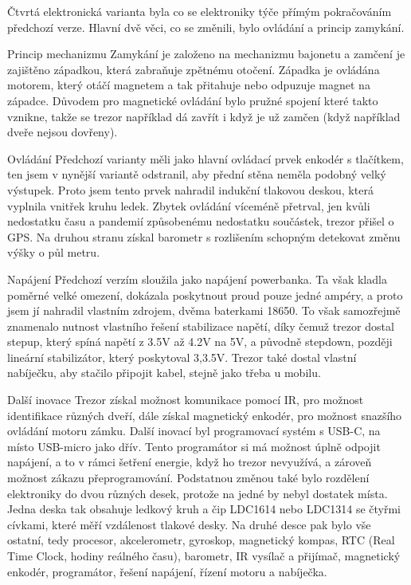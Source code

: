 Čtvrtá elektronická varianta byla co se elektroniky týče přímým pokračováním předchozí verze. Hlavní dvě věci, co se změnili, bylo ovládání 
a princip zamykání. 

Princip mechanizmu
Zamykání je založeno na mechanizmu bajonetu a zamčení je zajištěno západkou, která zabraňuje zpětnému otočení.
Západka je ovládána motorem, který otáčí magnetem a tak přitahuje nebo odpuzuje magnet na západce. Důvodem pro magnetické ovládání
bylo pružné spojení které takto vznikne, takže se trezor například dá zavřít i když je už zamčen (když například dveře nejsou dovřeny).

Ovládání
Předchozí varianty měli jako hlavní ovládací prvek enkodér s tlačítkem, ten jsem v nynější variantě odstranil, aby přední stěna neměla podobný velký 
výstupek. Proto jsem tento prvek nahradil indukční tlakovou deskou, která vyplnila vnitřek kruhu ledek. 
Zbytek ovládání víceméně přetrval, jen kvůli nedostatku času a pandemií způsobenému nedostatku součástek, trezor přišel o GPS. Na druhou stranu 
získal barometr s rozlišením schopným detekovat změnu výšky o půl metru.

Napájení
Předchozí verzím sloužila jako napájení powerbanka. Ta však kladla poměrné velké omezení, dokázala poskytnout proud pouze jedné ampéry, a proto 
jsem jí nahradil vlastním zdrojem, dvěma baterkami 18650. To však samozřejmě znamenalo nutnost vlastního řešení stabilizace napětí, díky čemuž 
trezor dostal stepup, který spíná napětí z 3.5V až 4.2V na 5V, a původně stepdown, později lineární stabilizátor, který poskytoval 3,3.5V.
Trezor také dostal vlastní nabíječku, aby stačilo připojit kabel, stejně jako třeba u mobilu.

Další inovace
Trezor získal možnost komunikace pomocí IR, pro možnost identifikace různých dveří, dále získal magnetický enkodér, pro možnost snazšího ovládání
motoru zámku. 
Další inovací byl programovací systém s USB-C, na místo USB-micro jako dřív. Tento programátor si má možnost úplně odpojit napájení, a to v rámci šetření 
energie, když ho trezor nevyužívá, a zároveň možnost zákazu přeprogramování.
Podstatnou změnou také bylo rozdělení elektroniky do dvou různých desek, protože na jedné by nebyl dostatek místa. Jedna deska tak obsahuje ledkový 
kruh a čip LDC1614 nebo LDC1314 se čtyřmi cívkami, které měří vzdálenost tlakové desky. Na druhé desce pak bylo vše ostatní, tedy procesor, akcelerometr,
gyroskop, magnetický kompas, RTC (Real Time Clock, hodiny reálného času), barometr, IR vysílač a přijímač, magnetický enkodér, programátor, řešení 
napájení, řízení motoru a nabíječka.